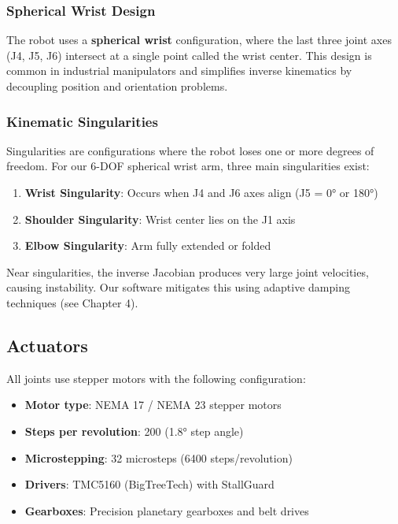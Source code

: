 \documentclass[12pt,a4paper]{report}
\begin{document}
\subsubsection{Spherical Wrist Design}

The robot uses a \textbf{spherical wrist} configuration, where the last three joint axes (J4, J5, J6) intersect at a single point called the wrist center. This design is common in industrial manipulators and simplifies inverse kinematics by decoupling position and orientation problems.

\subsubsection{Kinematic Singularities}

Singularities are configurations where the robot loses one or more degrees of freedom. For our 6-DOF spherical wrist arm, three main singularities exist:

\begin{enumerate}
    \item \textbf{Wrist Singularity}: Occurs when J4 and J6 axes align (J5 = 0° or 180°)
    \item \textbf{Shoulder Singularity}: Wrist center lies on the J1 axis
    \item \textbf{Elbow Singularity}: Arm fully extended or folded
\end{enumerate}

Near singularities, the inverse Jacobian produces very large joint velocities, causing instability. Our software mitigates this using adaptive damping techniques (see Chapter 4).

\subsection{Actuators}

All joints use stepper motors with the following configuration:

\begin{itemize}
    \item \textbf{Motor type}: NEMA 17 / NEMA 23 stepper motors
    \item \textbf{Steps per revolution}: 200 (1.8° step angle)
    \item \textbf{Microstepping}: 32 microsteps (6400 steps/revolution)
    \item \textbf{Drivers}: TMC5160 (BigTreeTech) with StallGuard \cite{tmc5160_prod}
    \item \textbf{Gearboxes}: Precision planetary gearboxes and belt drives
\end{itemize}
\end{document}
